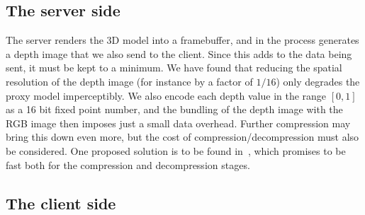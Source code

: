 \documentclass[10pt,conference,compsocconf]{IEEEtran}
\newcommand{\ie}{{i.e.}}
\begin{document}


\subsection{The server side}
\label{subsec:server}

The server renders the 3D model into a framebuffer, and in the process generates
a depth image that we also send to the client.  Since this adds to the data
being sent, it must be kept to a minimum. We have found that reducing the
spatial resolution of the depth image (for instance by a factor of $1/16$) only
degrades the proxy model imperceptibly.  We also encode each depth value in the
range $[0, 1]$ as a 16 bit fixed point number, and the bundling of the depth
image with the RGB image then imposes just a small data overhead.  Further
compression may bring this down even more, but the cost of
compression/decompression must also be considered.  One proposed solution is to
be found in~\cite{DBLP:journals/tvcg/Lindstrom14}, which promises to be fast
both for the compression and decompression stages.


\subsection{The client side}
\label{sec:client}
\end{document}
